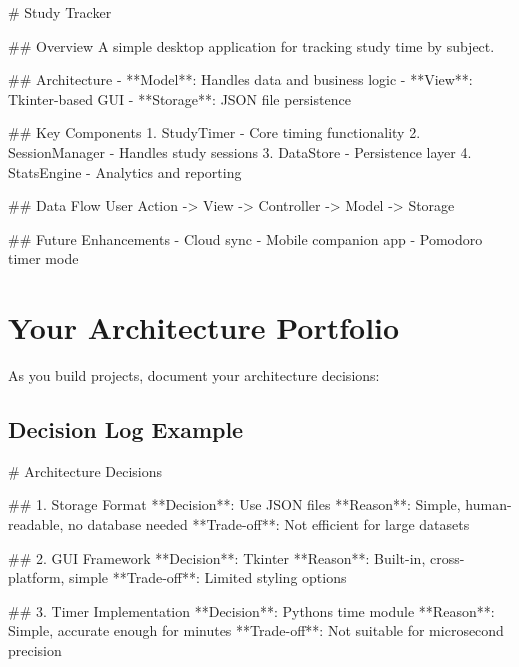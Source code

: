 \documentclass[
  letterpaper,
  DIV=11,
  numbers=noendperiod,
  oneside]{scrreprt}
\newenvironment{Shaded}{}{}
\newcommand{\FunctionTok}[1]{\textcolor[rgb]{0.44,0.26,0.76}{#1}}
\newcommand{\NormalTok}[1]{\textcolor[rgb]{0.14,0.16,0.18}{#1}}
\newcommand{\SpecialStringTok}[1]{\textcolor[rgb]{0.01,0.18,0.38}{#1}}
\begin{document}
\begin{Shaded}
\begin{Highlighting}[]
\FunctionTok{\# Study Tracker}

\FunctionTok{\#\# Overview}
\NormalTok{A simple desktop application for tracking study time by subject.}

\FunctionTok{\#\# Architecture}
\SpecialStringTok{{-} }\NormalTok{**Model**: Handles data and business logic}
\SpecialStringTok{{-} }\NormalTok{**View**: Tkinter{-}based GUI}
\SpecialStringTok{{-} }\NormalTok{**Storage**: JSON file persistence}

\FunctionTok{\#\# Key Components}
\SpecialStringTok{1. }\NormalTok{StudyTimer {-} Core timing functionality}
\SpecialStringTok{2. }\NormalTok{SessionManager {-} Handles study sessions}
\SpecialStringTok{3. }\NormalTok{DataStore {-} Persistence layer}
\SpecialStringTok{4. }\NormalTok{StatsEngine {-} Analytics and reporting}

\FunctionTok{\#\# Data Flow}
\NormalTok{User Action {-}\textgreater{} View {-}\textgreater{} Controller {-}\textgreater{} Model {-}\textgreater{} Storage}

\FunctionTok{\#\# Future Enhancements}
\SpecialStringTok{{-} }\NormalTok{Cloud sync}
\SpecialStringTok{{-} }\NormalTok{Mobile companion app}
\SpecialStringTok{{-} }\NormalTok{Pomodoro timer mode}
\end{Highlighting}
\end{Shaded}

\section{Your Architecture Portfolio}\label{your-architecture-portfolio}

As you build projects, document your architecture decisions:

\subsection{Decision Log Example}\label{decision-log-example}

\begin{Shaded}
\begin{Highlighting}[]
\FunctionTok{\# Architecture Decisions}

\FunctionTok{\#\# 1. Storage Format}
\NormalTok{**Decision**: Use JSON files}
\NormalTok{**Reason**: Simple, human{-}readable, no database needed}
\NormalTok{**Trade{-}off**: Not efficient for large datasets}

\FunctionTok{\#\# 2. GUI Framework  }
\NormalTok{**Decision**: Tkinter}
\NormalTok{**Reason**: Built{-}in, cross{-}platform, simple}
\NormalTok{**Trade{-}off**: Limited styling options}

\FunctionTok{\#\# 3. Timer Implementation}
\NormalTok{**Decision**: Python\textquotesingle{}s time module}
\NormalTok{**Reason**: Simple, accurate enough for minutes}
\NormalTok{**Trade{-}off**: Not suitable for microsecond precision}
\end{Highlighting}
\end{Shaded}
\end{document}
